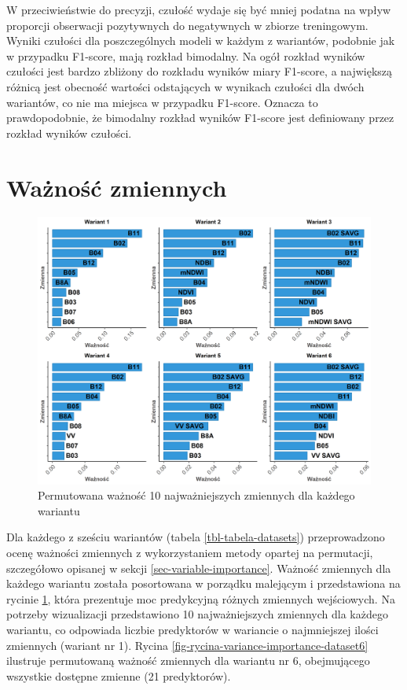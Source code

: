 \documentclass{amuthesis}
\begin{document}
W przeciwieństwie do precyzji, czułość wydaje się być mniej podatna na
wpływ proporcji obserwacji pozytywnych do negatywnych w zbiorze
treningowym. Wyniki czułości dla poszczególnych modeli w każdym z
wariantów, podobnie jak w przypadku F1-score, mają rozkład bimodalny. Na
ogół rozkład wyników czułości jest bardzo zbliżony do rozkładu wyników
miary F1-score, a największą różnicą jest obecność wartości odstających
w wynikach czułości dla dwóch wariantów, co nie ma miejsca w przypadku
F1-score. Oznacza to prawdopodobnie, że bimodalny rozkład wyników
F1-score jest definiowany przez rozkład wyników czułości.

\hypertarget{sec-results-variable-importance}{%
\section{Ważność zmiennych}\label{sec-results-variable-importance}}

\begin{figure}[t]

{\centering \includegraphics[width=1.05\textwidth,height=\textheight]{figures/importance_cowplot_pl.png}

}

\caption{\label{fig-rycina-variance-importance_cowplot}Permutowana
ważność 10 najważniejszych zmiennych dla każdego wariantu}

\end{figure}

Dla każdego z sześciu wariantów (tabela \ref{tbl-tabela-datasets})
przeprowadzono ocenę ważności zmiennych z wykorzystaniem metody opartej
na permutacji, szczegółowo opisanej w sekcji
\ref{sec-variable-importance}. Ważność zmiennych dla każdego wariantu
została posortowana w porządku malejącym i przedstawiona na rycinie
\ref{fig-rycina-variance-importance_cowplot}, która prezentuje moc
predykcyjną różnych zmiennych wejściowych. Na potrzeby wizualizacji
przedstawiono 10 najważniejszych zmiennych dla każdego wariantu, co
odpowiada liczbie predyktorów w wariancie o najmniejszej ilości
zmiennych (wariant nr 1). Rycina
\ref{fig-rycina-variance-importance-dataset6} ilustruje permutowaną
ważność zmiennych dla wariantu nr 6, obejmującego wszystkie dostępne
zmienne (21 predyktorów).
\end{document}
